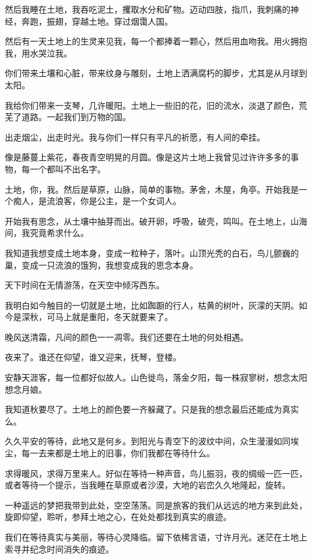 \documentclass[UTF8]{article}
\begin{document}
\par 然后我睡在土地，我吞吃泥土，攫取水分和矿物。迈动四肢，指爪，我刺痛的神经，奔跑，振翅，穿越土地。穿过烟霭人国。
\par 然后有一天土地上的生灵来见我，每一个都捧着一颗心，然后用血吻我。用火拥抱我，用水哭泣我。
\par 你们带来土壤和心脏，带来纹身与雕刻，土地上洒满腐朽的脚步，尤其是从月球到太阳。
\par 我给你们带来一支琴，几许暖阳。土地上一些旧的花，旧的流水，淡退了颜色，荒芜了道路。一起我们到万物的国。
\par 出走烟尘，出走时光。我与你们一样只有平凡的祈愿，有人间的牵挂。
\par 像是藤蔓上紫花，春夜青空明晃的月圆。像是这片土地上我曾见过许许多多的事物，每一个都叫不出名字。
\par 土地，你，我。然后是草原，山脉，简单的事物。茅舍，木屋，角亭。开始我是一个痴人，是流浪客，你是公主，是一个女词人。
\par 开始我有思念，从土壤中抽芽而出。破开卵，呼吸，破壳，鸣叫。在土地上，山海间，我究竟希求什么。
\par 我知道我想变成土地本身，变成一粒种子，落叶。山顶光秃的白石，鸟儿颤巍的巢，变成一只流浪的饿狗，我想变成我的思念本身。
\par 天下时间在无情游荡，在天空中倾泻西东。
\par 我明白如今触目的一切就是土地，比如踟蹰的行人，枯黄的树叶，灰濛的天阴。如今是深秋，可马上就是重阳，冬天就要来了。
\par 晚风送清霜，凡间的颜色一一凋零。我们还要在土地的何处相遇。
\\[0.6cm]
\par 夜来了。谁还在仰望，谁又迎来，抚琴，登楼。
\par 安静天涯客，每一位都好似故人。山色徙鸟，落金夕阳，每一株寂寥树，想念太阳想念月娘。
\par 我知道秋要尽了。土地上的颜色要一齐躲藏了。只是我的想念最后还能成为真实么。
\par 久久平安的等待，此地又是何乡。到阳光与青空下的波纹中间，众生漫漫如同埃尘，每一去来都是土地上的旧事，你们我都在等待什么。
\par 求得暖风，求得万里来人。好似在等待一种声音，鸟儿振羽，夜的绸缎一匹一匹，或者等待一个提示，当我睡在草原或者沙漠，大地的岩峦久久地隆起，旋转。
\par 一种遥远的梦把我带到此处，空空荡荡。同是旅客的我们从远远的地方来到此处，旋即仰望，聆听，参拜土地之心，在处处都找到真实的痕迹。
\par 我们在等待真实与美丽，等待心灵降临。留下依稀言语，寸许月光。迷茫在土地上索寻并纪念时间消失的痕迹。
\end{document}

